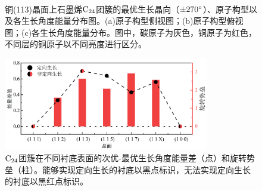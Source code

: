 \begin{figure}[!htb]
    \\[-0.5ex]
    \caption{铜(113)晶面上石墨烯$\rm{C_{24}}$团簇的最优生长晶向（$\SI{\pm 270}{\degree}$）、原子构型以及各生长角度能量分布图。(a)原子构型侧视图；(b)原子构型俯视图；(c)各生长角度能量分布。图中，碳原子为灰色，铜原子为红色，不同层的铜原子以不同亮度进行区分。}
    \label{GO_C24_113}
\end{figure}


\begin{figure}[htb]
    \includegraphics[width=0.8\textwidth]{pic/GO_C24_energyDiff_barrier.png}
    \caption{$\rm{C_{24}}$团簇在不同衬底表面的次优-最优生长角度能量差（点）和旋转势垒（柱）。能够实现定向生长的衬底以黑点标识，无法实现定向生长的衬底以黑红点标识。}
    \label{fig:GO_C24_energyDiff_barrier}
\end{figure}

